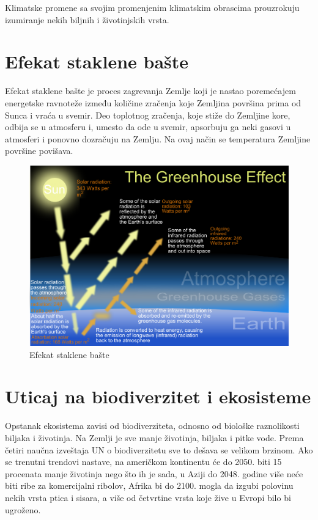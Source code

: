 \documentclass[a4paper]{article}
\begin{document}
Klimatske promene sa svojim promenjenim klimatskim obrascima prouzrokuju izumiranje nekih biljnih i životinjskih vrsta. 

\section{Efekat staklene bašte}	
\label{sec:efekat_staklene_baste}
Efekat staklene bašte je proces zagrevanja Zemlje koji je nastao poremećajem energetske ravnoteže između količine zračenja koje Zemljina površina prima od Sunca i vraća u svemir. Deo toplotnog zračenja, koje stiže do Zemljine kore, odbija se u atmosferu i, umesto da ode u svemir, apsorbuju ga neki gasovi u atmosferi i ponovno dozračuju na Zemlju. Na ovaj način se temperatura Zemljine površine povišava.

\begin{figure}[!ht]
\begin{center}
\includegraphics[scale=0.26]{slika3.png}
\end{center}
\caption{Efekat staklene bašte}
\label{fig:efekat}
\end{figure}

\section{Uticaj na biodiverzitet i ekosisteme}
\label{sec:uticaj_na_biodiverzitet_i_ekosisteme}
Opstanak ekosistema zavisi od biodiverziteta, odnosno od biološke raznolikosti biljaka i životinja. Na Zemlji je sve manje životinja, biljaka i pitke vode. Prema četiri naučna izveštaja UN o biodiverzitetu sve to dešava se velikom brzinom. Ako se trenutni trendovi nastave, na američkom kontinentu će do 2050. biti 15 procenata manje životinja nego što ih je sada, u Aziji do 2048. godine više neće biti ribe za komercijalni ribolov, Afrika bi do 2100. mogla da izgubi polovinu nekih vrsta ptica i sisara, a više od četvrtine vrsta koje žive u Evropi bilo bi ugroženo.
\end{document}
